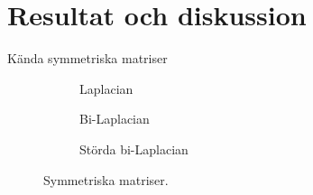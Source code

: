 \documentclass{beamer}
\begin{document}
\section{Resultat och diskussion}
\begin{frame}{Kända symmetriska matriser}
\begin{figure}[H]
    \centering
    \renewcommand{\arraystretch}{0.8}
    \begin{subfigure}{0.3\textwidth}
        \centering
        \caption{Laplacian}
    \end{subfigure}
    \begin{subfigure}{0.3\textwidth}
        \centering
        \caption{Bi-Laplacian}
        \end{subfigure}
        \begin{subfigure}{0.3\textwidth}
        \centering
        \caption{Störda bi-Laplacian}
    \end{subfigure}
    \caption{Symmetriska matriser.}
    \label{fig:sym_mats}
\end{figure}
\end{frame}
\end{document}
